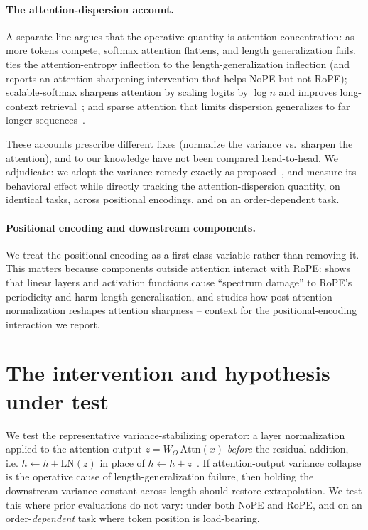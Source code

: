 \documentclass[11pt]{article}
\begin{document}
\paragraph{The attention-dispersion account.} A separate line argues that the operative quantity is
attention concentration: as more tokens compete, softmax attention flattens, and length generalization
fails. \cite{nopeentropy} ties the attention-entropy inflection to the length-generalization inflection
(and reports an attention-sharpening intervention that helps NoPE but not RoPE); scalable-softmax
sharpens attention by scaling logits by $\log n$ and improves long-context retrieval~\cite{ssmax}; and
sparse attention that limits dispersion generalizes to far longer sequences~\cite{sparselong}.

These accounts prescribe different fixes (normalize the variance vs.\ sharpen the attention), and to our
knowledge have not been compared head-to-head. We adjudicate: we adopt the variance remedy exactly as
proposed~\cite{vanishingvariance}, and measure its behavioral effect while directly tracking the
attention-dispersion quantity, on identical tasks, across positional encodings, and on an
order-dependent task.

\paragraph{Positional encoding and downstream components.} We treat the positional encoding as a
first-class variable rather than removing it. This matters because components outside attention interact
with RoPE: \cite{fope} shows that linear layers and activation functions cause ``spectrum damage'' to
RoPE's periodicity and harm length generalization, and \cite{postnorm} studies how post-attention
normalization reshapes attention sharpness -- context for the positional-encoding interaction we report.

\section{The intervention and hypothesis under test}
We test the representative variance-stabilizing operator: a layer normalization applied to the attention
output $z=W_O\,\mathrm{Attn}(x)$ \emph{before} the residual addition, i.e. $h \leftarrow h +
\mathrm{LN}(z)$ in place of $h \leftarrow h + z$~\cite{vanishingvariance}. If attention-output variance
collapse is the operative cause of length-generalization failure, then holding the downstream variance
constant across length should restore extrapolation. We test this where prior evaluations do not vary:
under both NoPE and RoPE, and on an order-\emph{dependent} task where token position is load-bearing.
\end{document}
